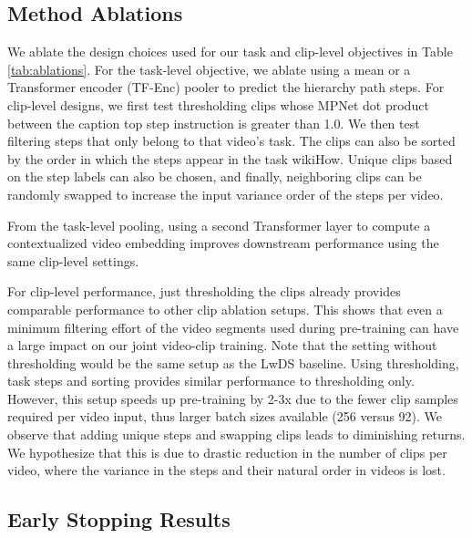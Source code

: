 \subsection{Method Ablations}
\label{sec:ablations}


We ablate the design choices used for our task and clip-level objectives in Table \ref{tab:ablations}. For the task-level objective, we ablate using a mean or a Transformer encoder (TF-Enc) pooler to predict the hierarchy path steps. For clip-level designs, we first test thresholding clips whose MPNet dot product between the caption top step instruction is greater than 1.0. We then test filtering steps that only belong to that video's task. The clips can also be sorted by the order in which the steps appear in the task wikiHow. Unique clips based on the step labels can also be chosen, and finally, neighboring clips can be randomly swapped to increase the input variance order of the steps per video. 

From the task-level pooling, using a second Transformer layer to compute a contextualized video embedding improves downstream performance using the same clip-level settings. 

For clip-level performance, just thresholding the clips already provides comparable performance to other clip ablation setups. This shows that even a minimum filtering effort of the video segments used during pre-training can have a large impact on our joint video-clip training. Note that the setting without thresholding would be the same setup as the LwDS baseline. Using thresholding, task steps and sorting provides similar performance to thresholding only. However, this setup speeds up pre-training by 2-3x due to the fewer clip samples required per video input, thus larger batch sizes available (256 versus 92). We observe that adding unique steps and swapping clips leads to diminishing returns. We hypothesize that this is due to drastic reduction in the number of clips per video, where the variance in the steps and their natural order in videos is lost. 

\subsection{Early Stopping Results}

